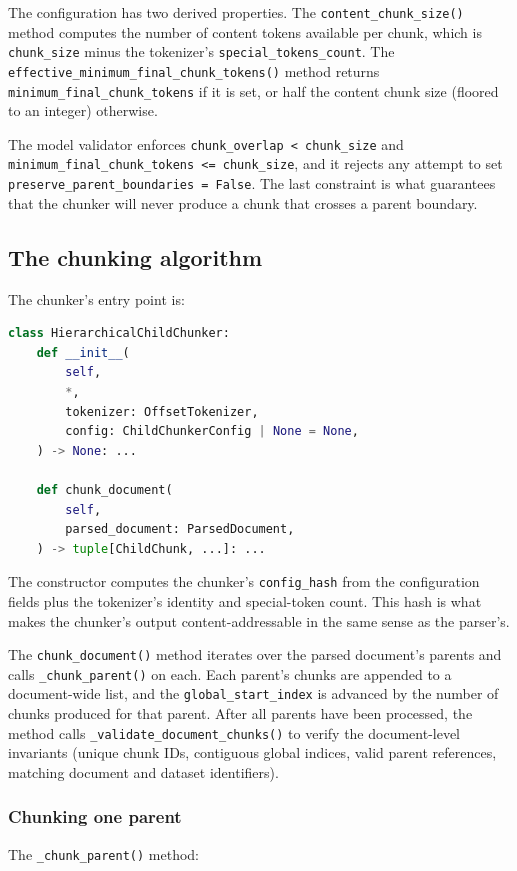 \documentclass[11pt,a4paper]{article}
\begin{document}
The configuration has two derived properties. The
\texttt{content\_chunk\_size()} method computes the number of content
tokens available per chunk, which is \texttt{chunk\_size} minus the
tokenizer's \texttt{special\_tokens\_count}. The
\texttt{effective\_minimum\_final\_chunk\_tokens()} method returns
\texttt{minimum\_final\_chunk\_tokens} if it is set, or half the
content chunk size (floored to an integer) otherwise.

The model validator enforces \texttt{chunk\_overlap < chunk\_size}
and \texttt{minimum\_final\_chunk\_tokens <= chunk\_size}, and it
rejects any attempt to set
\texttt{preserve\_parent\_boundaries = False}. The last constraint is
what guarantees that the chunker will never produce a chunk that
crosses a parent boundary.

\subsection{The chunking algorithm}
The chunker's entry point is:

\begin{lstlisting}[language=python]
class HierarchicalChildChunker:
    def __init__(
        self,
        *,
        tokenizer: OffsetTokenizer,
        config: ChildChunkerConfig | None = None,
    ) -> None: ...

    def chunk_document(
        self,
        parsed_document: ParsedDocument,
    ) -> tuple[ChildChunk, ...]: ...
\end{lstlisting}

The constructor computes the chunker's \texttt{config\_hash} from the
configuration fields plus the tokenizer's identity and special-token
count. This hash is what makes the chunker's output content-addressable
in the same sense as the parser's.

The \texttt{chunk\_document()} method iterates over the parsed
document's parents and calls \texttt{\_chunk\_parent()} on each. Each
parent's chunks are appended to a document-wide list, and the
\texttt{global\_start\_index} is advanced by the number of chunks
produced for that parent. After all parents have been processed, the
method calls \texttt{\_validate\_document\_chunks()} to verify the
document-level invariants (unique chunk IDs, contiguous global
indices, valid parent references, matching document and dataset
identifiers).

\subsubsection{Chunking one parent}
The \texttt{\_chunk\_parent()} method:
\end{document}
